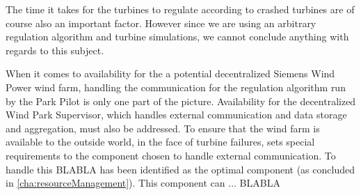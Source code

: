 %
%

The time it takes for the turbines to regulate according to crashed turbines are of course also an important factor. However since we are using an arbitrary regulation algorithm and turbine simulations, we cannot conclude anything with regards to this subject.


When it comes to availability for the a potential decentralized Siemens Wind Power wind farm, handling the communication for the regulation algorithm run by the Park Pilot is only one part of the picture. Availability for the decentralized Wind Park Supervisor, which handles external communication and data storage and aggregation, must also be addressed. 
To ensure that the wind farm is available to the outside world, in the face of turbine failures, sets special requirements to the component chosen to handle external communication. To handle this BLABLA  has been identified as the optimal component (as concluded in \cref{cha:resourceManagement}). This component can ... BLABLA 

